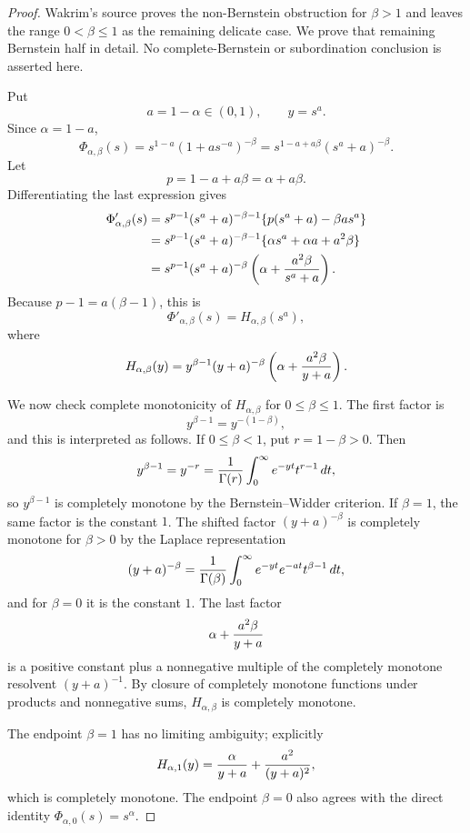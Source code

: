 \documentclass[11pt]{article}
\numberwithin{equation}{section}
\theoremstyle{definition}
\theoremstyle{remark}
\newcommand{\1}{\mathbf 1}
\begin{document}
\begin{proof}
Wakrim's source proves the non-Bernstein obstruction for \(\beta>1\) and
leaves the range \(0<\beta\le1\) as the remaining delicate case.  We prove
that remaining Bernstein half in detail.  No complete-Bernstein or
subordination conclusion is asserted here.

Put
\[
  a=1-\alpha\in(0,1),\qquad y=s^a .
\]
Since \(\alpha=1-a\),
\[
 \Phi_{\alpha,\beta}(s)
 =s^{1-a}(1+a s^{-a})^{-\beta}
 =s^{1-a+a\beta}(s^a+a)^{-\beta}.
\]
Let
\[
  p=1-a+a\beta=\alpha+a\beta .
\]
Differentiating the last expression gives
\[
\begin{aligned}
 \Phi'_{\alpha,\beta}(s)
 &=s^{p-1}(s^a+a)^{-\beta-1}
     \{p(s^a+a)-\beta a s^a\}  \\
 &=s^{p-1}(s^a+a)^{-\beta-1}
     \{\alpha s^a+\alpha a+a^2\beta\}       \\
 &=s^{p-1}(s^a+a)^{-\beta}
     \left(\alpha+{a^2\beta\over s^a+a}\right).
\end{aligned}
\]
Because \(p-1=a(\beta-1)\), this is
\[
  \Phi'_{\alpha,\beta}(s)=H_{\alpha,\beta}(s^a),
\]
where
\[
 H_{\alpha,\beta}(y)
 =y^{\beta-1}(y+a)^{-\beta}
      \left(\alpha+{a^2\beta\over y+a}\right).
\]

We now check complete monotonicity of \(H_{\alpha,\beta}\) for
\(0\le\beta\le1\).  The first factor is
\[
  y^{\beta-1}=y^{-(1-\beta)},
\]
and this is interpreted as follows.  If \(0\le\beta<1\), put
\(r=1-\beta>0\).  Then
\[
  y^{\beta-1}=y^{-r}
  ={1\over\Gamma(r)}
    \int_0^\infty e^{-yt}t^{r-1}\,dt,
\]
so \(y^{\beta-1}\) is completely monotone by the Bernstein--Widder
criterion.  If \(\beta=1\), the same factor is the constant \(1\).  The shifted factor
\((y+a)^{-\beta}\) is completely monotone for \(\beta>0\) by the Laplace
representation
\[
 (y+a)^{-\beta}
 ={1\over\Gamma(\beta)}
   \int_0^\infty e^{-yt}e^{-at}t^{\beta-1}\,dt,
\]
and for \(\beta=0\) it is the constant \(1\).  The last factor
\[
  \alpha+{a^2\beta\over y+a}
\]
is a positive constant plus a nonnegative multiple of the completely monotone
resolvent \((y+a)^{-1}\).  By closure of completely monotone functions under
products and nonnegative sums, \(H_{\alpha,\beta}\) is completely monotone.

The endpoint \(\beta=1\) has no limiting ambiguity; explicitly
\[
 H_{\alpha,1}(y)
 ={\alpha\over y+a}+{a^2\over (y+a)^2},
\]
which is completely monotone.  The endpoint \(\beta=0\) also agrees with the
direct identity \(\Phi_{\alpha,0}(s)=s^\alpha\).


\end{proof}
\end{document}
